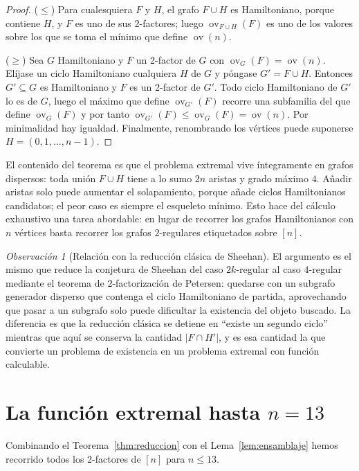 \documentclass[11pt,a4paper]{article}
\theoremstyle{definition}
\theoremstyle{remark}
\newtheorem{observacion}[teorema]{Observación}
\newcommand{\ov}{\operatorname{ov}}
\begin{document}
\begin{proof}
($\le$) Para cualesquiera $F$ y $H$, el grafo $F\cup H$ es Hamiltoniano, porque contiene $H$, y $F$ es uno de sus 2-factores; luego $\ov_{F\cup H}(F)$ es uno de los valores sobre los que se toma el mínimo que define $\ov(n)$.

($\ge$) Sea $G$ Hamiltoniano y $F$ un 2-factor de $G$ con $\ov_G(F)=\ov(n)$. Elíjase un ciclo Hamiltoniano cualquiera $H$ de $G$ y póngase $G'=F\cup H$. Entonces $G'\subseteq G$ es Hamiltoniano y $F$ es un 2-factor de $G'$. Todo ciclo Hamiltoniano de $G'$ lo es de $G$, luego el máximo que define $\ov_{G'}(F)$ recorre una subfamilia del que define $\ov_G(F)$ y por tanto $\ov_{G'}(F)\le\ov_G(F)=\ov(n)$. Por minimalidad hay igualdad. Finalmente, renombrando los vértices puede suponerse $H=(0,1,\dots,n-1)$.
\end{proof}

El contenido del teorema es que el problema extremal vive íntegramente en grafos dispersos: toda unión $F\cup H$ tiene a lo sumo $2n$ aristas y grado máximo $4$. Añadir aristas solo puede aumentar el solapamiento, porque añade ciclos Hamiltonianos candidatos; el peor caso es siempre el esqueleto mínimo. Esto hace del cálculo exhaustivo una tarea abordable: en lugar de recorrer los grafos Hamiltonianos con $n$ vértices basta recorrer los grafos $2$-regulares etiquetados sobre $[n]$.

\begin{observacion}[Relación con la reducción clásica de Sheehan]\label{obs:clasica}
El argumento es el mismo que reduce la conjetura de Sheehan del caso $2k$-regular al caso $4$-regular mediante el teorema de $2$-factorización de Petersen: quedarse con un subgrafo generador disperso que contenga el ciclo Hamiltoniano de partida, aprovechando que pasar a un subgrafo solo puede dificultar la existencia del objeto buscado. La diferencia es que la reducción clásica se detiene en ``existe un segundo ciclo'' mientras que aquí se conserva la cantidad $|F\cap H'|$, y es esa cantidad la que convierte un problema de existencia en un problema extremal con función calculable.
\end{observacion}

\section{La función extremal hasta \texorpdfstring{$n=13$}{n=13}}\label{sec:exacta}

Combinando el Teorema~\ref{thm:reduccion} con el Lema~\ref{lem:ensamblaje} hemos recorrido todos los 2-factores de $[n]$ para $n\le13$.
\end{document}
